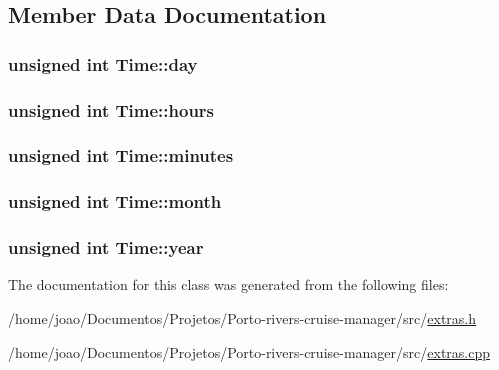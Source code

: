 \subsection{Member Data Documentation}
\subsubsection[{\texorpdfstring{day}{day}}]{\setlength{\rightskip}{0pt plus 5cm}unsigned int Time\+::day\hspace{0.3cm}{\ttfamily [protected]}}\hypertarget{classTime_a9e8b7d2c0e22ab2b87a5870d0492e508}{}\label{classTime_a9e8b7d2c0e22ab2b87a5870d0492e508}
\subsubsection[{\texorpdfstring{hours}{hours}}]{\setlength{\rightskip}{0pt plus 5cm}unsigned int Time\+::hours\hspace{0.3cm}{\ttfamily [protected]}}\hypertarget{classTime_a08e7d6202b1fe8c01c25bf6688d41712}{}\label{classTime_a08e7d6202b1fe8c01c25bf6688d41712}
\subsubsection[{\texorpdfstring{minutes}{minutes}}]{\setlength{\rightskip}{0pt plus 5cm}unsigned int Time\+::minutes\hspace{0.3cm}{\ttfamily [protected]}}\hypertarget{classTime_ab9da5c3324d296464bf26131fd5d8c3f}{}\label{classTime_ab9da5c3324d296464bf26131fd5d8c3f}
\subsubsection[{\texorpdfstring{month}{month}}]{\setlength{\rightskip}{0pt plus 5cm}unsigned int Time\+::month\hspace{0.3cm}{\ttfamily [protected]}}\hypertarget{classTime_a6076ed85da3f1d76e8c5d014ae239748}{}\label{classTime_a6076ed85da3f1d76e8c5d014ae239748}
\subsubsection[{\texorpdfstring{year}{year}}]{\setlength{\rightskip}{0pt plus 5cm}unsigned int Time\+::year\hspace{0.3cm}{\ttfamily [protected]}}\hypertarget{classTime_ae2f1e52f8d00060a7cf7376927d65994}{}\label{classTime_ae2f1e52f8d00060a7cf7376927d65994}


The documentation for this class was generated from the following files\+:\begin{DoxyCompactItemize}
\item 
/home/joao/\+Documentos/\+Projetos/\+Porto-\/rivers-\/cruise-\/manager/src/\hyperlink{extras_8h}{extras.\+h}\item 
/home/joao/\+Documentos/\+Projetos/\+Porto-\/rivers-\/cruise-\/manager/src/\hyperlink{extras_8cpp}{extras.\+cpp}\end{DoxyCompactItemize}
